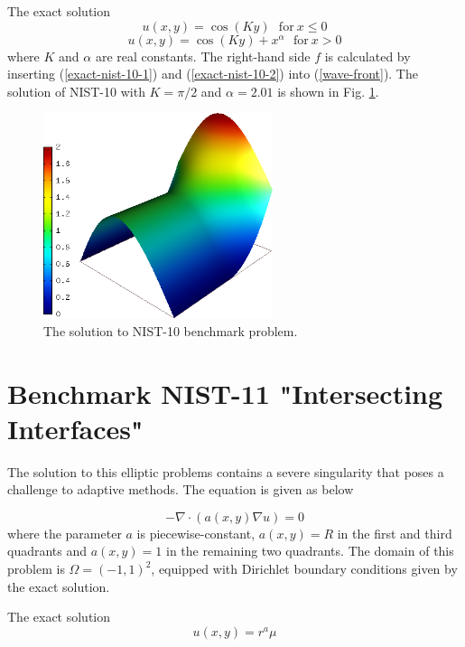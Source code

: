 \documentclass[12pt]{elsarticle}
\begin{document}
The exact solution
\begin{equation}\label{exact-nist-10-1}
u(x,y) = \cos(Ky)\ \ \ \mbox{for}\ x \le 0
\end{equation}
\begin{equation}\label{exact-nist-10-2}
u(x,y) = \cos(Ky) + x^{\alpha}\ \ \ \mbox{for}\ x > 0
\end{equation}
where $K$ and $\alpha$ are real constants.
The right-hand side $f$ is calculated by inserting
(\ref{exact-nist-10-1}) and (\ref{exact-nist-10-2}) into (\ref{wave-front}).
The solution of NIST-10 with $K = \pi/2$ and
$\alpha = 2.01$ is shown in Fig. \ref{fig:sln-nist10}.

\begin{figure}[!ht]
\centering
\includegraphics[height=6cm]{nist/nist-10/solution.png}
\caption{The solution to NIST-10 benchmark problem.}
\label{fig:sln-nist10}
\end{figure}

\section{Benchmark NIST-11 "Intersecting Interfaces"}
\label{sec:bench-11}

The solution to this elliptic problems contains a severe
singularity that poses a challenge to adaptive methods.
The equation is given as below

\begin{equation} \label{intersecting}
-\nabla \cdot (a(x,y) \nabla u) = 0
\end{equation}
where the parameter $a$ is piecewise-constant,
$a(x,y) = R$ in the first and third quadrants
and $a(x,y) = 1$ in the remaining two quadrants.
The domain of this problem is $\Omega = (-1, 1)^2$, equipped with
Dirichlet boundary conditions given by the exact solution.

The exact solution
\begin{equation}\label{exact-nist-11}
u(x,y) = r^{a} \mu
\end{equation}
\end{document}
